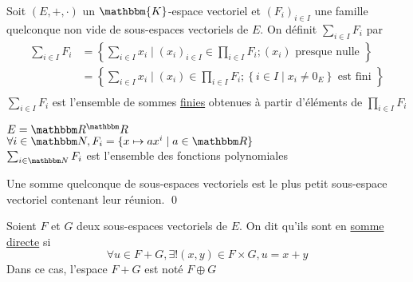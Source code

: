 \begin{defn}
	Soit $(E,+,\cdot)$ un $\mathbbm{K}$-espace vectoriel et $\left( F_i \right) _{i \in I}$ une famille quelconque non vide de sous-espaces vectoriels de $E$. On définit $\sum_{i \in I} F_i$ par 
	\begin{align*}
		\sum_{i \in I} F_i
		&= \left\{ \sum_{i \in I} x_i  \mid  \left(x_i\right)_{i \in I} \in \prod_{i \in I}F_i; (x_i) \text{ presque nulle } \right\} \\
		&= \left\{ \sum_{i \in I} x_i  \mid  \left(x_i\right) \in \prod_{i \in I}F_i; \left\{ i \in I  \mid  x_i \neq 0_E \right\} \text{ est fini } \right\} \\
	\end{align*}
	$\sum_{i \in I} F_i$ est l'ensemble de sommes \underline{finies} obtenues à partir d'éléments de $\prod _{i \in I}F_i$
\end{defn}

\begin{exm}
	$E = \R^\R$ \\
	$\forall  i \in \N, F_i = \{x \mapsto ax^i  \mid a \in \R\}$\\
	$\sum_{i \in \N} F_i$ est l'ensemble des fonctions polynomiales
\end{exm}

\begin{prop}
	Une somme quelconque de sous-espaces vectoriels est le plus petit sous-espace vectoriel contenant leur réunion.
	\qed
\end{prop}

\begin{defn}
	Soient $F$ et $G$ deux sous-espaces vectoriels de $E$. On dit qu'ils sont en \underline{somme directe} si \[
		\forall u \in F+G, \exists! (x,y)  \in F\times G, u = x+y
	\]
	Dans ce cas, l'espace $F+G$ est noté $F \oplus G$
\end{defn}

